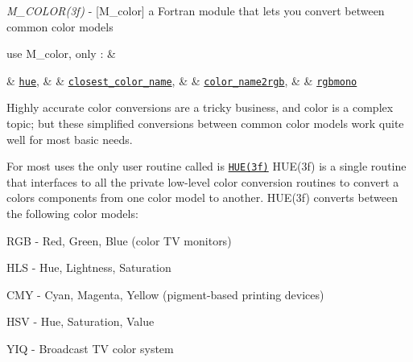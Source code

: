 \begin{DoxyDescription}
\item[\label{_M_COLOR}%
N\+A\+ME ]{\itshape M\+\_\+\+C\+O\+L\+O\+R(3f)} -\/ \mbox{[}M\+\_\+color\mbox{]} a Fortran module that lets you convert between common color models 


\item[S\+Y\+N\+O\+P\+S\+IS ]
\begin{DoxyPre}
    use M\_color, only : \&\end{DoxyPre}



\begin{DoxyPre}       \& \href{hue.3.html}{\tt hue}, \&
       \& \href{closest_color_name.3.html}{\tt closest\_color\_name}, \&
       \& \href{color_name2rgb.3.html}{\tt color\_name2rgb}, \&
       \& \href{rgbmono.3.html}{\tt rgbmono}
 \end{DoxyPre}





\item[D\+E\+S\+C\+R\+I\+P\+T\+I\+ON ]



Highly accurate color conversions are a tricky business, and color is a complex topic; but these simplified conversions between common color models work quite well for most basic needs. 





For most uses the only user routine called is \href{hue.3.html}{\tt H\+U\+E(3f)} H\+U\+E(3f) is a single routine that interfaces to all the private low-\/level color conversion routines to convert a color\textquotesingle{}s components from one color model to another. H\+U\+E(3f) converts between the following color models\+: 




\begin{DoxyItemize}
\item R\+GB -\/ Red, Green, Blue (color TV monitors) 
\item H\+LS -\/ Hue, Lightness, Saturation 
\item C\+MY -\/ Cyan, Magenta, Yellow (pigment-\/based printing devices) 
\item H\+SV -\/ Hue, Saturation, Value 
\item Y\+IQ -\/ Broadcast TV color system 
\end{DoxyItemize}




\end{DoxyDescription}
